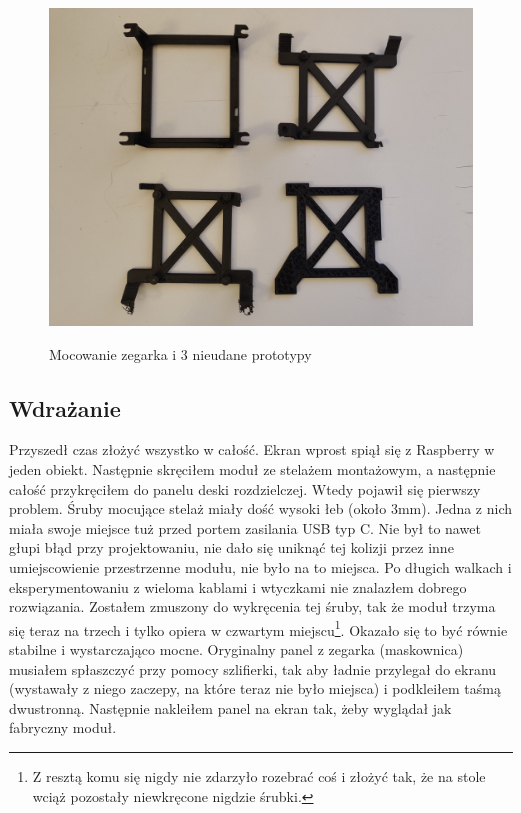 \documentclass[declaration,shortabstract, inz]{iithesis}
\begin{document}
    \begin{figure}[htp]
        \centering
        \includegraphics[width=12cm]{images/mounting.jpg}
        \label{fig:mounting}
        \caption{Mocowanie zegarka i 3 nieudane prototypy}
    \end{figure}
    \FloatBarrier


\subsection{Wdrażanie}
    Przyszedł czas złożyć wszystko w całość. Ekran wprost spiął się z Raspberry w jeden obiekt. Następnie skręciłem moduł ze stelażem montażowym, a następnie całość przykręciłem do panelu deski rozdzielczej. Wtedy pojawił się pierwszy problem. Śruby mocujące stelaż miały dość wysoki łeb (około 3mm). Jedna z nich miała swoje miejsce tuż przed portem zasilania USB typ C. Nie był to nawet głupi błąd przy projektowaniu, nie dało się uniknąć tej kolizji przez inne umiejscowienie przestrzenne modułu, nie było na to miejsca. Po długich walkach i eksperymentowaniu z wieloma kablami i wtyczkami nie znalazłem dobrego rozwiązania. Zostałem zmuszony do wykręcenia tej śruby, tak że moduł trzyma się teraz na trzech i tylko opiera w czwartym miejscu\footnote{Z resztą komu się nigdy nie zdarzyło rozebrać coś i złożyć tak, że na stole wciąż pozostały niewkręcone nigdzie śrubki.}. Okazało się to być równie stabilne i wystarczająco mocne. Oryginalny panel z zegarka (maskownica) musiałem spłaszczyć przy pomocy szlifierki, tak aby ładnie przylegał do ekranu (wystawały z niego zaczepy, na które teraz nie było miejsca) i podkleiłem taśmą dwustronną. Następnie nakleiłem panel na ekran tak, żeby wyglądał jak fabryczny moduł.
    
\end{document}
